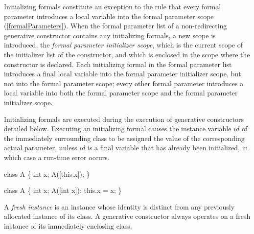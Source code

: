 \documentclass{article}
\begin{document}
\LMHash{}
Initializing formals constitute an exception to the rule that every formal parameter introduces a local variable into the formal parameter scope (\ref{formalParameters}).
When the formal parameter list of a non-redirecting generative constructor contains any initializing formals, a new scope is introduced, the {\em formal parameter initializer scope}, which is the current scope of the initializer list of the constructor, and which is enclosed in the scope where the constructor is declared.
Each initializing formal in the formal parameter list introduces a final local variable into the formal parameter initializer scope, but not into the formal parameter scope; every other formal parameter introduces a local variable into both the formal parameter scope and the formal parameter initializer scope.


\LMHash{}
Initializing formals are executed during the execution of generative constructors detailed below.
Executing an initializing formal  causes the instance variable $id$ of the immediately surrounding class to be assigned the value of the corresponding actual parameter,
unless $id$ is a final variable that has already been initialized, in which case a run-time error occurs.


\begin{dartCode}
class A \{
  int x;
  A([this.x]);
\}
\end{dartCode}


\begin{dartCode}
class A \{
  int x;
  A([int x]): this.x = x;
\}
\end{dartCode}

\LMHash{}
A {\em fresh instance} is an instance whose identity is distinct from any previously allocated instance of its class.
A generative constructor always operates on a fresh instance of its immediately enclosing class.
\end{document}
